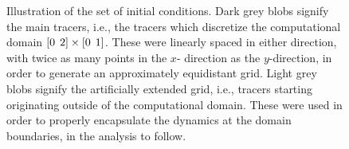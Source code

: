 \begin{figure}[htpb]
    \centering
    \def\svgwidth{0.8\linewidth}{}
    \caption[Illustration of the set of initial conditions]
        {Illustration of the set of initial conditions.
                Dark grey blobs signify the main tracers, i.e., the tracers
                which discretize the computational domain
            $[0\hspace{1ex}2]\times[0\hspace{1ex}1]$. These were linearly
        spaced in either direction, with twice as many points in the $x$-
        direction as the $y$-direction, in order to generate an approximately
        equidistant grid. Light grey blobs
        signify the artificially extended grid, i.e., tracers starting
        originating outside of the computational domain. These were used in
        order to properly encapsulate the dynamics at the domain boundaries,
        in the analysis to follow.}
    \label{fig:initialgrid}
\end{figure}
